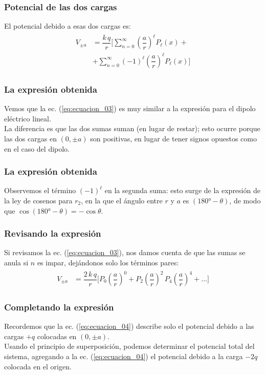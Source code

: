 \begin{frame}
\frametitle{Potencial de las dos cargas}
El potencial debido a esas dos cargas es:
\begin{align}
\begin{aligned}
V_{\pm a} &= \dfrac{k \, q}{r} \bigg[ \sum_{n=0}^{\infty} \left( \dfrac{a}{r} \right)^{\ell} P_{\ell}(x) + \\[0.5em]
&+ \sum_{n=0}^{\infty} (-1)^{\ell} \left( \dfrac{a}{r} \right)^{\ell} P_{\ell}(x) \bigg]
\end{aligned}
\label{eq:ecuacion_03}
\end{align}
\end{frame}
\begin{frame}
\frametitle{La expresión obtenida}
Vemos que la ec. (\ref{eq:ecuacion_03}) es muy similar a la expresión para el dipolo eléctrico lineal.
\\
\bigskip
\pause
La diferencia es que las dos sumas suman (en lugar de restar); esto ocurre porque las dos cargas en $(0, \pm a)$ son positivas, en lugar de tener signos opuestos como en el caso del dipolo.
\end{frame}
\begin{frame}
\frametitle{La expresión obtenida}
Observemos el término $(-1)^{\ell}$ en la segunda suma: esto surge de la expresión de la ley de cosenos para $r_{2}$, en la que el ángulo entre $r$ y $a$ es $(\ang{180} - \theta)$, de modo que $\cos (\ang{180} - \theta) = - \cos \theta$.
\end{frame}
\begin{frame}
\frametitle{Revisando la expresión}
Si revisamos la ec. (\ref{eq:ecuacion_03}), nos damos cuenta de que las sumas se anula si $n$ es impar, dejándonos solo los términos pares:
\begin{align}
\begin{aligned}
V_{\pm a} &= \dfrac{2 \, k \, q}{r} \bigg[ P_{0} \left( \dfrac{a}{r} \right)^{0} + P_{2} \left( \dfrac{a}{r} \right)^{2} \, P_{4} \left( \dfrac{a}{r} \right)^{4} + \ldots \bigg]
\end{aligned}
\label{eq:ecuacion_04}
\end{align}
\end{frame}
\begin{frame}
\frametitle{Completando la expresión}
Recordemos que la ec. (\ref{eq:ecuacion_04}) describe solo el potencial debido a las cargas $+q$ colocadas en $(0, \pm a)$.
\\
\bigskip
\pause
Usando el principio de superposición, podemos determinar el potencial total del sistema, agregando a la ec. (\ref{eq:ecuacion_04}) el potencial debido a la carga $-2q$ colocada en el origen.
\end{frame}
